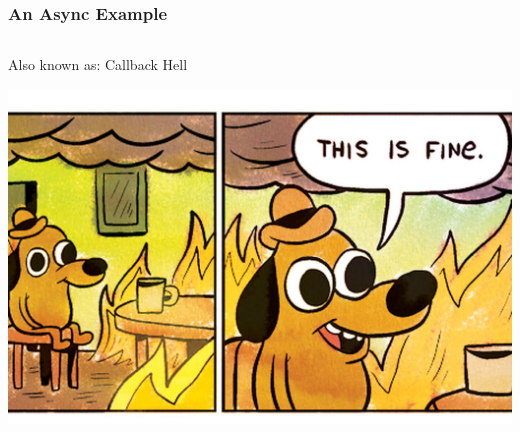 \documentclass{beamer}
\begin{document}

\begin{frame}[fragile]
  \frametitle{An Async Example}
  \inputminted[fontsize=\footnotesize]{javascript}{code/async.js}
\end{frame}


\begin{frame}
  Also known as: Callback Hell
 \begin{center}
 \includegraphics[scale=0.20,keepaspectratio=true]{./thisisfine.jpeg}
 \end{center}
\end{frame}
\end{document}
